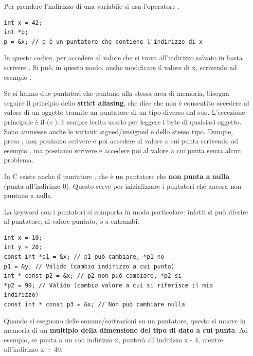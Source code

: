 \documentclass[11pt, a4paper, titlepage, oneside]{scrbook}
\begin{document}
Per prendere l'indirizzo di una variabile si usa l'operatore \codeb{\&}. 
\begin{lstlisting}[style=C]
int x = 42;
int *p;
p = &x; // p è un puntatore che contiene l'indirizzo di x
\end{lstlisting}

In questo codice, per accedere al valore che si trova all'indirizzo salvato in  basta scrivere . Si può, in questo modo, anche modificare il valore di x, scrivendo ad esempio .

\begin{Proposizione}
\label{propos-strict-aliasing}
Se si hanno due puntatori che puntano alla stessa area di memoria, bisogna seguire il principio dello \textbf{strict aliasing}, che dice che non è consentito accedere al valore di un oggetto tramite un puntatore di un tipo diverso dal suo. L'eccezione principale è il  (e ): è sempre lecito usarlo per leggere i byte di qualsiasi oggetto. Sono ammesse anche le varianti signed/unsigned e  dello stesso tipo. Dunque, presa , non possiamo scrivere  e poi accedere al valore a cui punta  scrivendo ad esempio , ma possiamo scrivere  e accedere poi al valore a cui punta  senza alcun problema.
\end{Proposizione}


\begin{Definizione}
\label{def-puntatore-null}
In C esiste anche il puntatore , che è un puntatore che \textbf{non punta a nulla} (punta all'indirizzo 0). Questo serve per inizializzare i puntatori che ancora non puntano a nulla.
\end{Definizione}

La keyword  con i puntatori si comporta in modo particolare: infatti si può riferire al puntatore, al valore puntato, o a entrambi.
\begin{lstlisting}[style=C]
int x = 10;
int y = 20;
const int *p1 = &x; // p1 può cambiare, *p1 no
p1 = &y; // Valido (cambio indirizzo a cui punto)
int * const p2 = &x; // p2 non può cambiare, *p2 si
*p2 = 99; // Valido (cambio valore a cui si riferisce il mio indirizzo)
const int * const p3 = &x; // Non può cambiare nulla
\end{lstlisting}

Quando si eseguono delle somme/sottrazioni su un puntatore, questo si muove in memoria di un \textbf{multiplo della dimensione del tipo di dato a cui punta}. Ad esempio, se  punta a un  con indirizzo x,  punterà all'indirizzo x - 4, mentre  all'indirizzo x + 40. 
\end{document}
